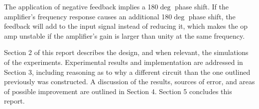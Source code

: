 The application of negative feedback implies a 180$\deg$ phase shift. If the amplifier’s frequency response causes an additional 180$\deg$ phase shift, the feedback will add to the input signal instead of reducing it, which makes the op amp unstable if the amplifier’s gain is larger than unity at the same frequency. 

\noindent Section 2 of this report describes the design, and when relevant, the simulations of the experiments. Experimental results and implementation are addressed in Section 3, including reasoning as to why a different circuit than the one outlined previously was constructed. A discussion of the results, sources of error, and areas of possible improvement are outlined in Section 4. Section 5 concludes this report. \newline

